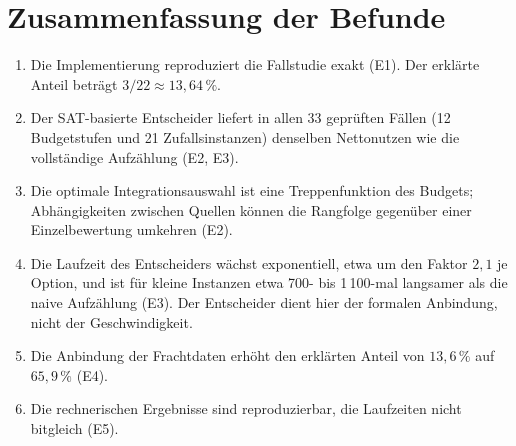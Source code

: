 \documentclass[a4paper,12pt,twoside]{report}
\theoremstyle{definition}
\begin{document}
\section{Zusammenfassung der Befunde}
\begin{enumerate}
\item Die Implementierung reproduziert die Fallstudie exakt (E1). Der erklärte Anteil beträgt $3/22\approx 13{,}64\,\%$.
\item Der SAT-basierte Entscheider liefert in allen 33 geprüften Fällen (12 Budgetstufen und 21 Zufallsinstanzen) denselben Nettonutzen wie die vollständige Aufzählung (E2, E3).
\item Die optimale Integrationsauswahl ist eine Treppenfunktion des Budgets; Abhängigkeiten zwischen Quellen können die Rangfolge gegenüber einer Einzelbewertung umkehren (E2).
\item Die Laufzeit des Entscheiders wächst exponentiell, etwa um den Faktor $2{,}1$ je Option, und ist für kleine Instanzen etwa 700- bis 1\,100-mal langsamer als die naive Aufzählung (E3). Der Entscheider dient hier der formalen Anbindung, nicht der Geschwindigkeit.
\item Die Anbindung der Frachtdaten erhöht den erklärten Anteil von $13{,}6\,\%$ auf $65{,}9\,\%$ (E4).
\item Die rechnerischen Ergebnisse sind reproduzierbar, die Laufzeiten nicht bitgleich (E5).
\end{enumerate}
\end{document}
